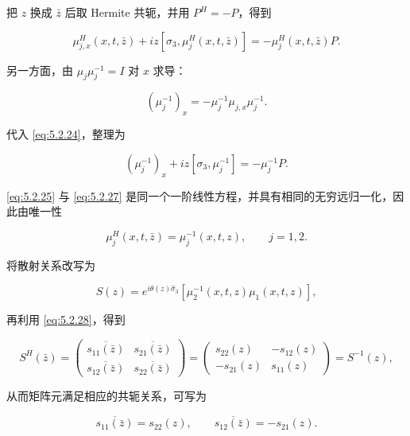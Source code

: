 \documentclass[
    lang=cn,
    scheme=chinese,
    mode=simple,
    device=normal,
    color=blue,
    math=cm,
    thmcnt=section,
    12pt,
    nowatermark
]{elegantbook}
\begin{document}
把 $z$ 换成 $\bar z$ 后取 Hermite 共轭，并用 $P^H=-P$，得到

\begin{equation}
    \mu_{j,x}^H(x,t,\bar z)
    +
    iz[\sigma_3,\mu_j^H(x,t,\bar z)]
    =
    -\mu_j^H(x,t,\bar z)P.
    \tag{5.2.25}
    \label{eq:5.2.25}
\end{equation}

另一方面，由 $\mu_j\mu_j^{-1}=I$ 对 $x$ 求导：

\begin{equation}
    (\mu_j^{-1})_x
    =
    -\mu_j^{-1}\mu_{j,x}\mu_j^{-1}.
    \tag{5.2.26}
    \label{eq:5.2.26}
\end{equation}

代入 \eqref{eq:5.2.24}，整理为

\begin{equation}
    (\mu_j^{-1})_x
    +
    iz[\sigma_3,\mu_j^{-1}]
    =
    -\mu_j^{-1}P.
    \tag{5.2.27}
    \label{eq:5.2.27}
\end{equation}

\eqref{eq:5.2.25} 与 \eqref{eq:5.2.27} 是同一个一阶线性方程，并具有相同的无穷远归一化，因此由唯一性

\begin{equation}
    \mu_j^H(x,t,\bar z)
    =
    \mu_j^{-1}(x,t,z),
    \qquad j=1,2.
    \tag{5.2.28}
    \label{eq:5.2.28}
\end{equation}

将散射关系改写为

\begin{equation}
    S(z)
    =
    e^{i\theta(z)\widehat{\sigma}_3}
    \left[\mu_2^{-1}(x,t,z)\mu_1(x,t,z)\right],
    \tag{5.2.29}
    \label{eq:5.2.29}
\end{equation}

再利用 \eqref{eq:5.2.28}，得到

\[
    S^H(\bar z)
    =
    \begin{pmatrix}
        \overline{s_{11}(\bar z)} & \overline{s_{21}(\bar z)} \\
        \overline{s_{12}(\bar z)} & \overline{s_{22}(\bar z)}
    \end{pmatrix}
    =
    \begin{pmatrix}
        s_{22}(z)  & -s_{12}(z) \\
        -s_{21}(z) & s_{11}(z)
    \end{pmatrix}
    =
    S^{-1}(z),
\]

从而矩阵元满足相应的共轭关系，可写为

\begin{equation}
    \overline{s_{11}(\bar z)}=s_{22}(z),
    \qquad
    \overline{s_{12}(\bar z)}=-s_{21}(z).
    \tag{5.2.30}
    \label{eq:5.2.30}
\end{equation}
\end{document}
